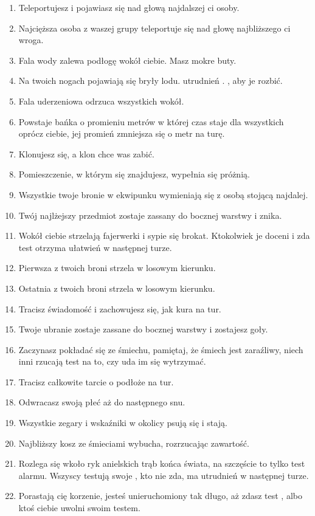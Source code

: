 \begin{enumerate}
	\item Teleportujesz i pojawiasz się nad głową najdalszej ci osoby.
	\item Najcięższa osoba z waszej grupy teleportuje się nad głowę najbliższego ci wroga.
	\item Fala wody zalewa podłogę wokół ciebie. Masz mokre buty.
	\item Na twoich nogach pojawiają się bryły lodu. \dx{} utrudnień \aba{}. \abs{}, aby je rozbić.
	\item Fala uderzeniowa odrzuca wszystkich wokół.
	\item Powstaje bańka o promieniu \diiii{} metrów w której czas staje dla wszystkich oprócz ciebie, jej promień zmniejsza się o metr na turę.
	\item Klonujesz się, a klon chce was zabić.
	\item Pomieszczenie, w którym się znajdujesz, wypełnia się próżnią.
	\item Wszystkie twoje bronie w ekwipunku wymieniają się z osobą stojącą najdalej.
	\item Twój najlżejszy przedmiot zostaje zassany do bocznej warstwy i znika.
	\item Wokół ciebie strzelają fajerwerki i sypie się brokat. Ktokolwiek je doceni i zda test \abt{} otrzyma \dvi{} ułatwień w następnej turze.
	\item Pierwsza z twoich broni strzela w losowym kierunku.
	\item Ostatnia z twoich broni strzela w losowym kierunku.
	\item Tracisz świadomość i zachowujesz się, jak kura na \diiii{} tur.
	\item Twoje ubranie zostaje zassane do bocznej warstwy i zostajesz goły.
	\item Zaczynasz pokładać się ze śmiechu, pamiętaj, że śmiech jest zaraźliwy, niech inni rzucają test \abh{} na to, czy uda im się wytrzymać.
	\item Tracisz całkowite tarcie o podłoże na \diiii{} tur.
	\item Odwracasz swoją płeć aż do następnego snu.
	\item Wszystkie zegary i wskaźniki w okolicy psują się i stają.
	\item Najbliższy kosz ze śmieciami wybucha, rozrzucając zawartość.
	\item Rozlega się wkoło ryk anielskich trąb końca świata, na szczęście to tylko test alarmu. Wszyscy testują swoje \abh{}, kto nie zda, ma \dvi{} utrudnień w następnej turze.
	\item Porastają cię korzenie, jesteś unieruchomiony tak długo, aż zdasz test \abs{}, albo ktoś ciebie uwolni swoim testem.

\end{enumerate}
